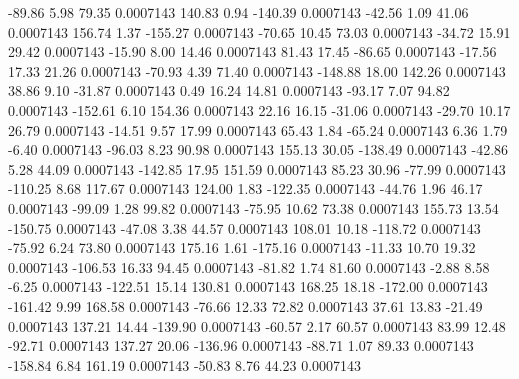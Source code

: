       -89.86        5.98       79.35     0.0007143
      140.83        0.94     -140.39     0.0007143
      -42.56        1.09       41.06     0.0007143
      156.74        1.37     -155.27     0.0007143
      -70.65       10.45       73.03     0.0007143
      -34.72       15.91       29.42     0.0007143
      -15.90        8.00       14.46     0.0007143
       81.43       17.45      -86.65     0.0007143
      -17.56       17.33       21.26     0.0007143
      -70.93        4.39       71.40     0.0007143
     -148.88       18.00      142.26     0.0007143
       38.86        9.10      -31.87     0.0007143
        0.49       16.24       14.81     0.0007143
      -93.17        7.07       94.82     0.0007143
     -152.61        6.10      154.36     0.0007143
       22.16       16.15      -31.06     0.0007143
      -29.70       10.17       26.79     0.0007143
      -14.51        9.57       17.99     0.0007143
       65.43        1.84      -65.24     0.0007143
        6.36        1.79       -6.40     0.0007143
      -96.03        8.23       90.98     0.0007143
      155.13       30.05     -138.49     0.0007143
      -42.86        5.28       44.09     0.0007143
     -142.85       17.95      151.59     0.0007143
       85.23       30.96      -77.99     0.0007143
     -110.25        8.68      117.67     0.0007143
      124.00        1.83     -122.35     0.0007143
      -44.76        1.96       46.17     0.0007143
      -99.09        1.28       99.82     0.0007143
      -75.95       10.62       73.38     0.0007143
      155.73       13.54     -150.75     0.0007143
      -47.08        3.38       44.57     0.0007143
      108.01       10.18     -118.72     0.0007143
      -75.92        6.24       73.80     0.0007143
      175.16        1.61     -175.16     0.0007143
      -11.33       10.70       19.32     0.0007143
     -106.53       16.33       94.45     0.0007143
      -81.82        1.74       81.60     0.0007143
       -2.88        8.58       -6.25     0.0007143
     -122.51       15.14      130.81     0.0007143
      168.25       18.18     -172.00     0.0007143
     -161.42        9.99      168.58     0.0007143
      -76.66       12.33       72.82     0.0007143
       37.61       13.83      -21.49     0.0007143
      137.21       14.44     -139.90     0.0007143
      -60.57        2.17       60.57     0.0007143
       83.99       12.48      -92.71     0.0007143
      137.27       20.06     -136.96     0.0007143
      -88.71        1.07       89.33     0.0007143
     -158.84        6.84      161.19     0.0007143
      -50.83        8.76       44.23     0.0007143
